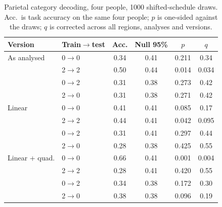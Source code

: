 \documentclass[conference]{IEEEtran}
\begin{document}
\newpage
\begin{table}[H]
\caption{Parietal category decoding, four people, 1000 shifted-schedule draws. Acc.\ is task accuracy on the same four people; $p$ is one-sided against the draws; $q$ is corrected across all regions, analyses and versions.}
\label{tabS:shift}
\centering\small
\begin{tabular}{llcccc}
\toprule
Version & Train$\to$test & Acc. & Null 95\% & $p$ & $q$ \\
\midrule
As analysed & 0$\to$0 & 0.34 & 0.41 & 0.211 & 0.34 \\
 & 2$\to$2 & 0.50 & 0.44 & 0.014 & 0.034 \\
 & 0$\to$2 & 0.31 & 0.38 & 0.273 & 0.42 \\
 & 2$\to$0 & 0.31 & 0.38 & 0.271 & 0.42 \\
Linear & 0$\to$0 & 0.41 & 0.41 & 0.085 & 0.17 \\
 & 2$\to$2 & 0.44 & 0.41 & 0.042 & 0.095 \\
 & 0$\to$2 & 0.31 & 0.41 & 0.297 & 0.44 \\
 & 2$\to$0 & 0.28 & 0.38 & 0.425 & 0.55 \\
Linear + quad. & 0$\to$0 & 0.66 & 0.41 & 0.001 & 0.004 \\
 & 2$\to$2 & 0.28 & 0.41 & 0.420 & 0.55 \\
 & 0$\to$2 & 0.34 & 0.38 & 0.172 & 0.30 \\
 & 2$\to$0 & 0.38 & 0.38 & 0.096 & 0.19 \\
\bottomrule
\end{tabular}
\end{table}
\end{document}
